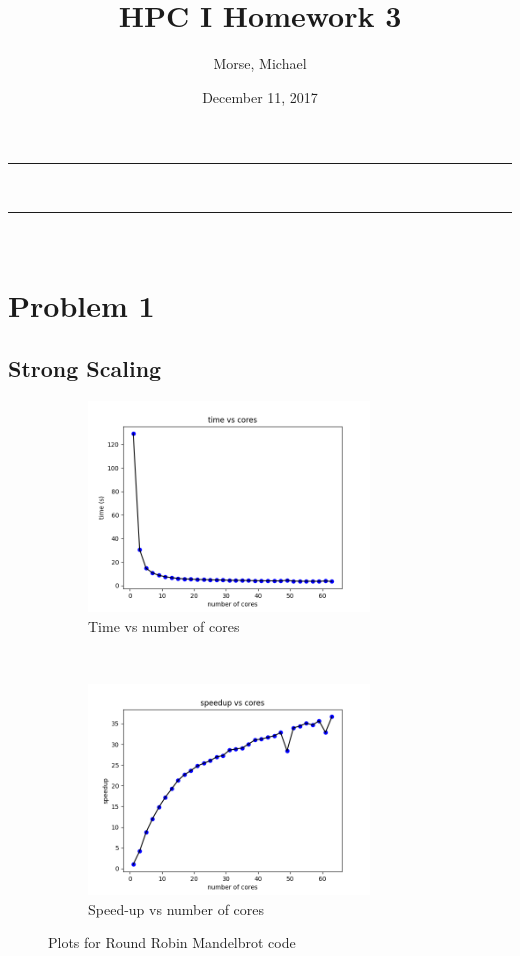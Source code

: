 \documentclass[12pt]{article}
\title{HPC I Homework 3}
\author{Morse, Michael}
\date{December 11, 2017}
\makeatletter
\newcommand{\nline}{\rule{\linewidth}{0.5pt}}
\theoremstyle{plain}
\theoremstyle{definition}
\renewcommand{\maketitle}{
\begin{center}
\nline\\
\vspace{2ex}
{\huge \textsc{\@title}}
\nline\\
{\large\textsc{\@author \hfill \@date}}
\vspace{4ex}
\end{center}
}
\makeatother
\begin{document}
\maketitle
\newpage

\section{Problem 1}
\subsection{Strong Scaling}
\begin{figure}[t]
    \centering
    \begin{subfigure}[t]{0.5\textwidth}
        \centering
        \includegraphics[height=2.2in]{timeq1_strong.png}
         \caption{Time vs number of cores}
    \end{subfigure}%
    ~
    \begin{subfigure}[t]{0.5\textwidth}
        \centering
        \includegraphics[height=2.2in]{speedupq1_strong.png}
        \caption{Speed-up vs number of cores}
    \end{subfigure}
    \caption{Plots for Round Robin Mandelbrot code}
    \label{fig:q1a}
\end{figure}
\end{document}
